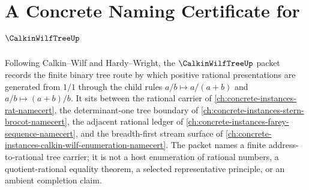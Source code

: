 \chapter{A Concrete Naming Certificate for $\CalkinWilfTreeUp$}
\label{ch:concrete-instances-calkin-wilf-tree-namecert}

Following Calkin--Wilf and Hardy--Wright, the $\CalkinWilfTreeUp$ packet records the finite binary tree route by which positive rational presentations are generated from $1/1$ through the child rules $a/b \mapsto a/(a+b)$ and $a/b \mapsto (a+b)/b$. It sits between the rational carrier of \autoref{ch:concrete-instances-rat-namecert}, the determinant-one tree boundary of \autoref{ch:concrete-instances-stern-brocot-namecert}, the adjacent rational ledger of \autoref{ch:concrete-instances-farey-sequence-namecert}, and the breadth-first stream surface of \autoref{ch:concrete-instances-calkin-wilf-enumeration-namecert}. The packet names a finite address-to-rational tree carrier; it is not a host enumeration of rational numbers, a quotient-rational equality theorem, a selected representative principle, or an ambient completion claim.

